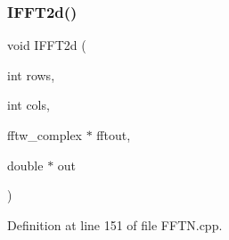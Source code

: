 \subsubsection{I\+F\+F\+T2d()\hspace{0.1cm}{\footnotesize\ttfamily [2/2]}}
{\footnotesize\ttfamily void I\+F\+F\+T2d (\begin{DoxyParamCaption}\item[{int}]{rows,  }\item[{int}]{cols,  }\item[{fftw\+\_\+complex $\ast$}]{fftout,  }\item[{double $\ast$}]{out }\end{DoxyParamCaption})}



Definition at line 151 of file F\+F\+T\+N.\+cpp.

